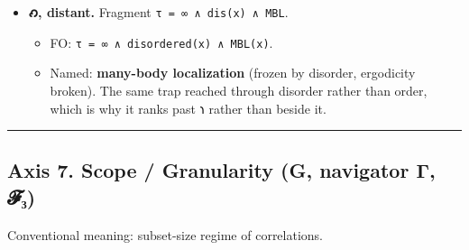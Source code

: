 \begin{itemize}
  \begin{itemize}
  \tightlist
  \item
    FO: \texttt{τ\ =\ ∞\ ∧\ ordered(x)}.
  \item
    Named: \textbf{frozen by order} (kinetically trapped, non-ergodic).
    The store is infinite and inaccessible: held forever, ordered, with
    no open gate. Maximum τ, unusable.
  \end{itemize}
\item
  \textbf{𐑺, distant.} Fragment \texttt{τ\ =\ ∞\ ∧\ dis(x)\ ∧\ MBL}.

  \begin{itemize}
  \tightlist
  \item
    FO: \texttt{τ\ =\ ∞\ ∧\ disordered(x)\ ∧\ MBL(x)}.
  \item
    Named: \textbf{many-body localization} (frozen by disorder,
    ergodicity broken). The same trap reached through disorder rather
    than order, which is why it ranks past 𐑪 rather than beside it.
  \end{itemize}
\end{itemize}

\begin{center}\rule{0.5\linewidth}{0.5pt}\end{center}

\hypertarget{axis-7.-scope-granularity-g-navigator-ux3b3-ux1d4d5ux2083}{%
\subsection{Axis 7. Scope / Granularity (G, navigator Γ,
𝓕₃)}\label{axis-7.-scope-granularity-g-navigator-ux3b3-ux1d4d5ux2083}}

Conventional meaning: subset-size regime of correlations.

